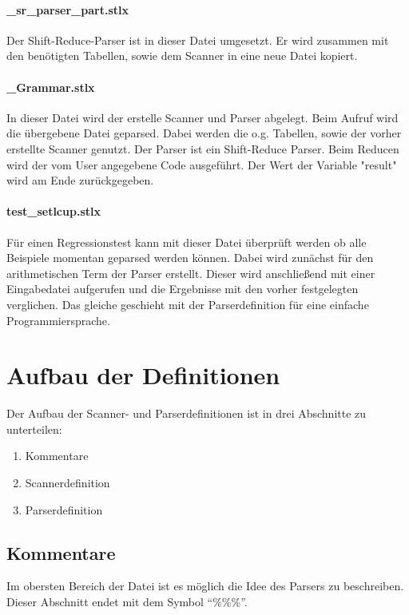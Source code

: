 \paragraph{\_sr\_parser\_part.stlx} Der Shift-Reduce-Parser ist in dieser Datei umgesetzt. Er wird zusammen mit den benötigten Tabellen, sowie dem Scanner in eine neue Datei kopiert. 
\paragraph{\_Grammar.stlx} In dieser Datei wird der erstelle Scanner und Parser abgelegt. Beim Aufruf wird die übergebene Datei geparsed. Dabei werden die o.g. Tabellen, sowie der vorher erstellte Scanner genutzt. Der Parser ist ein Shift-Reduce Parser. Beim Reducen wird der vom User angegebene Code ausgeführt. Der Wert der Variable "result" wird am Ende zurückgegeben.
\paragraph{test\_setlcup.stlx} Für einen Regressionstest kann mit dieser Datei überprüft werden ob alle Beispiele momentan geparsed werden können. Dabei wird zunächst für den arithmetischen Term der Parser erstellt. Dieser wird anschließend mit einer Eingabedatei aufgerufen und die Ergebnisse mit den vorher festgelegten verglichen. Das gleiche geschieht mit der Parserdefinition für eine einfache Programmiersprache.
\section{Aufbau der Definitionen}

Der Aufbau der Scanner- und Parserdefinitionen ist in drei Abschnitte zu unterteilen:
\begin{enumerate}
	\item Kommentare
	\item Scannerdefinition
	\item Parserdefinition
\end{enumerate}
\subsection{Kommentare}
Im obersten Bereich der Datei ist es möglich die Idee des Parsers zu beschreiben.
Dieser Abschnitt endet mit dem Symbol "`\%\%\%"'. 
